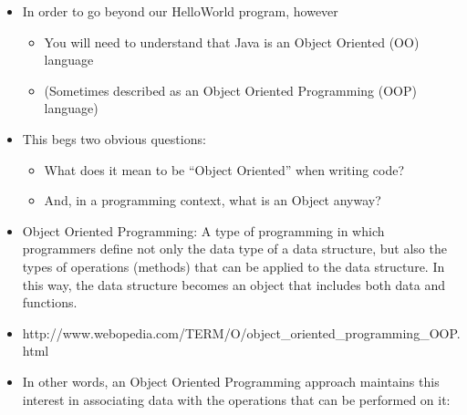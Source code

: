 \documentclass{beamer}
\begin{document}
\begin{frame}
\begin{itemize}
\item In order to go beyond our HelloWorld program, however
\begin{itemize}
\item You will need to understand that Java is an Object Oriented (OO) language
\item (Sometimes described as an Object Oriented Programming (OOP) language)
\end{itemize}
\end{itemize}
\end{frame}

\begin{frame}\begin{itemize}
\item This begs two obvious questions:
\begin{itemize}
\item What does it mean to be ``Object Oriented'' when
writing code?
\item And, in a programming context, what is an
Object anyway?
\end{itemize}
\end{itemize}
\end{frame}

\begin{frame}
\begin{itemize}
\item Object Oriented Programming: A type of programming in which programmers
define not only the data type of a data structure, but also the types
of operations (methods) that can be applied to the data structure.
In this way, the data structure becomes an object that includes both
data and functions.
\tiny
\item http://www.webopedia.com/TERM/O/object\_oriented\_programming\_OOP.html
\end{itemize}
\end{frame}


\begin{frame}
\begin{itemize}
\item In other words, an Object Oriented Programming approach maintains this interest in associating
data with the operations that can be performed on it:
\end{itemize}
\end{frame}
\end{document}
